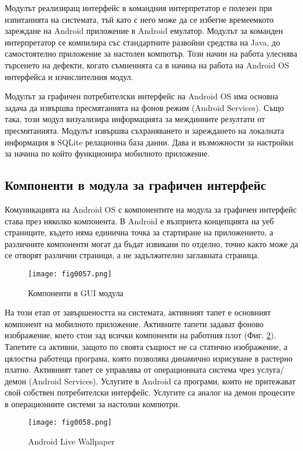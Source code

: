 Модулът реализиращ интерфейс в командния интерпретатор е полезен при изпитанията на системата, тъй като с него може да се избегне времеемкото зареждане на Android приложение в Android емулатор. Модулът за команден интерпретатор се компилира със стандартните развойни средства на Java, до самостоятелно приложение за настолен компютър. Този начин на работа улеснява търсенето на дефекти, когато съмненията са в начина на работа на Android OS интерфейса и изчислителния модул. 

Модулът за графичен потребителски интерфейс на Android OS има основна задача да извършва пресмятанията на фонов режим (Android Services). Също така, този модул визуализира информацията за междинните резултати от пресмятанията. Модулът извършва съхраняването и зареждането на локалната информация в SQLite релационна база данни. Дава и възможности за настройки за начина по който функционира мобилното приложение. 

\subsection{Компоненти в модула за графичен интерфейс}

Комуникацията на Android OS с компонентите на модула за графичен интерфейс става през няколко компонента. В Android е възприета концепцията на уеб страниците, където няма единична точка за стартиране на приложението, а различните компоненти могат да бъдат извикани по отделно, точно както може да се отворят различни страници, а не задължително заглавната страница. 

\begin{figure}[H]
  \centering
  \texttt{[image: fig0057.png]}
  \caption{Компоненти в GUI модула}
\label{fig0057}
\end{figure}

На този етап от завършеността на системата, активният тапет е основният компонент на мобилното приложение. Активните тапети задават фоново изображение, което стои зад всички компоненти на работния плот (Фиг. \ref{fig0058}). Тапетите са активни, защото по своята същност не са статично изображение, а цялостна работеща програма, която позволява динамично изрисуване в растерно платно. Активният тапет се управлява от операционната система чрез услуга/демон (Android Services). Услугите в Android са програми, които не притежават свой собствен потребителски интерфейс. Услугите са аналог на демон процесите в операционните системи за настолни компютри. 

\begin{figure}[H]
  \centering
  \texttt{[image: fig0058.png]}
  \caption{Android Live Wallpaper}
\label{fig0058}
\end{figure}

